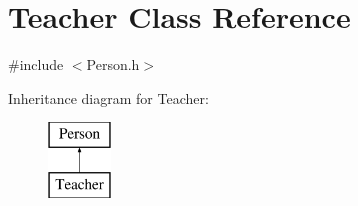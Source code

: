 \hypertarget{class_teacher}{}\section{Teacher Class Reference}
\label{class_teacher}


{\ttfamily \#include $<$Person.\+h$>$}

Inheritance diagram for Teacher\+:\begin{figure}[H]
\begin{center}
\leavevmode
\includegraphics[height=2.000000cm]{class_teacher}
\end{center}
\end{figure}
